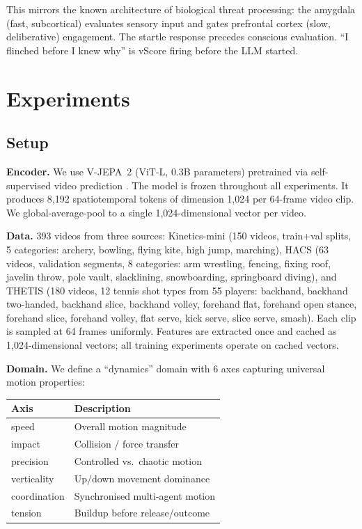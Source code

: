 \documentclass[11pt]{article}
\begin{document}
This mirrors the known architecture of biological threat processing: the amygdala (fast, subcortical) evaluates sensory input and gates prefrontal cortex (slow, deliberative) engagement. The startle response precedes conscious evaluation. ``I flinched before I knew why'' is vScore firing before the LLM started.

\section{Experiments}

\subsection{Setup}

\textbf{Encoder.} We use V-JEPA~2 (ViT-L, 0.3B parameters) pretrained via self-supervised video prediction \citep{bardes2025}. The model is frozen throughout all experiments. It produces 8{,}192 spatiotemporal tokens of dimension 1{,}024 per 64-frame video clip. We global-average-pool to a single 1{,}024-dimensional vector per video.

\textbf{Data.} 393 videos from three sources: Kinetics-mini (150 videos, train+val splits, 5 categories: archery, bowling, flying kite, high jump, marching), HACS \citep{zhao2019} (63 videos, validation segments, 8 categories: arm wrestling, fencing, fixing roof, javelin throw, pole vault, slacklining, snowboarding, springboard diving), and THETIS \citep{gourgari2013} (180 videos, 12 tennis shot types from 55 players: backhand, backhand two-handed, backhand slice, backhand volley, forehand flat, forehand open stance, forehand slice, forehand volley, flat serve, kick serve, slice serve, smash). Each clip is sampled at 64 frames uniformly. Features are extracted once and cached as 1{,}024-dimensional vectors; all training experiments operate on cached vectors.

\textbf{Domain.} We define a ``dynamics'' domain with 6 axes capturing universal motion properties:

\begin{table}[h]
\centering
\begin{tabular}{ll}
\toprule
\textbf{Axis} & \textbf{Description} \\
\midrule
speed & Overall motion magnitude \\
impact & Collision / force transfer \\
precision & Controlled vs.\ chaotic motion \\
verticality & Up/down movement dominance \\
coordination & Synchronised multi-agent motion \\
tension & Buildup before release/outcome \\
\bottomrule
\end{tabular}
\end{table}
\end{document}
